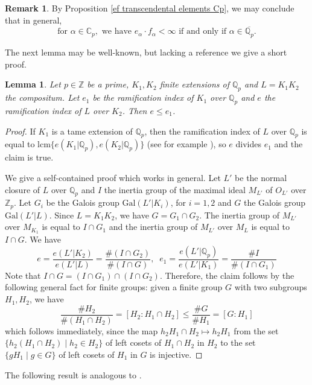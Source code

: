 \documentclass[10pt]{article}
\numberwithin{equation}{section}
\newtheorem{Lem}[equation]{Lemma}
\theoremstyle{definition}\newtheorem{Def}[equation]{Definition}
\newtheorem{Rem}[equation]{Remark}
\theoremstyle{definition}\newtheorem{Ques}[equation]{Question}
\newcommand{\Q}{\mathbb{Q}}
\newcommand{\Z}{\mathbb{Z}}
\newcommand{\C}{\mathbb{C}}
\newcommand{\oQp}{\overline{\Q_p}}
\newcommand{\Gal}{\text{Gal}}
\begin{document}
\begin{Rem}\label{eafaoQp}
By Proposition \ref{ef transcendental elements Cp}, we may conclude that in general,
\begin{equation*}
\text{for }\alpha\in\C_p, \text{ we have }e_{\alpha}\cdot f_{\alpha}<\infty \text{ if and only if }\alpha\in\oQp.
\end{equation*}
\end{Rem}

The next lemma may be well-known, but lacking a reference we give a short proof.
\begin{Lem}\label{ramification compositum}
Let $p\in\Z$ be a prime, $K_1,K_2$ finite extensions of $\Q_p$ and $L=K_1K_2$ the compositum. Let $e_1$ be the ramification index of $K_1$ over $\Q_p$ and $e$ the ramification index of $L$ over $K_2$. Then $e\leq e_1$.
\end{Lem}
\begin{proof}
If $K_1$ is a tame extension of $\Q_p$, then the ramification index of $L$ over $\Q_p$ is equal to lcm$\{e(K_1|\Q_p),e(K_2|\Q_p)\}$   (see for example \cite{ChabHal}), so $e$ divides $e_1$ and the claim is true. 

We give a self-contained proof which works in general. Let $L'$ be the normal closure of $L$ over $\Q_p$ and $I$ the inertia group of the maximal ideal $M_{L'}$  of $O_{L'}$ over $\Z_p$. Let $G_i$ be the Galois group $\Gal(L'|K_i)$, for $i=1,2$ and $G$ the Galois group $\Gal(L'|L)$. Since $L=K_1K_2$, we have $G=G_1\cap G_2$. The inertia group of $M_{L'}$ over $M_{K_1}$ is equal to $I\cap G_1$ and the inertia group of $M_{L'}$ over $M_L$ is equal to $I\cap G$. We have
$$e=\frac{e(L'|K_2)}{e(L'|L)}=\frac{\#(I\cap G_2)}{\#(I\cap G)},\;\;e_1=\frac{e(L'|\Q_p)}{e(L'|K_1)}=\frac{\#I}{\#(I\cap G_1)}$$
Note that $I\cap G=(I\cap G_1)\cap(I\cap G_2)$. Therefore, the claim follows by the following general fact for finite groups: given a finite group $G$ with two subgroups $H_1,H_2$, we have 
$$\frac{\#H_2}{\#(H_1\cap H_2)}=[H_2:H_1\cap H_2]\leq\frac{\#G}{\#H_1}=[G:H_1]$$
which follows immediately, since the map $h_2 H_1\cap H_2\mapsto h_2 H_1$ from the set $\{ h_2(H_1\cap H_2)\mid h_2\in H_2\}$ of left cosets of $H_1\cap H_2$ in $H_2$ to the set $\{gH_1\mid g\in G\}$ of left cosets of $H_1$ in $G$ is injective. 
\end{proof}

The following result is analogous to \cite[Theorem 2.5]{PerTransc}.
\end{document}
